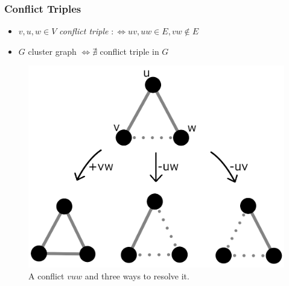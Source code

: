 \documentclass{beamer}
\begin{document}
\begin{frame}
	\frametitle{Conflict Triples}
	\begin{itemize}
		\item $v, u, w \in V$ \emph{conflict triple} $:\Leftrightarrow uv, uw \in E, vw \notin E$
		\item $G$ cluster graph $\Leftrightarrow \nexists $ conflict triple in $G$
	\end{itemize}

	\begin{figure}[h]
		\centering
		\includegraphics[scale=0.5]{conflicts}
		\caption{A conflict $v u w$ and three ways to resolve it.}
		\label{fig:conflicts}
	\end{figure}
\end{frame}
\end{document}
